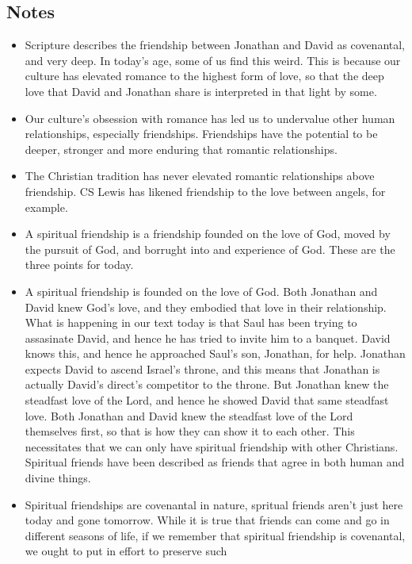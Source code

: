\subsection*{Notes}
\begin{itemize}
  \item{Scripture describes the friendship between Jonathan and David as
  covenantal, and very deep.  In today's age, some of us find this weird.
  This is because our culture has elevated romance to the highest form of
  love, so that the deep love that David and Jonathan share is interpreted in
  that light by some.}
  \item{Our culture's obsession with romance has led us to undervalue other
  human relationships, especially friendships.  Friendships have the
  potential to be deeper, stronger and more enduring that romantic
  relationships.}
  \item{The Christian tradition has never elevated romantic relationships
  above friendship.  CS Lewis has likened friendship to the love between
  angels, for example.}
  \item{A spiritual friendship is a friendship founded on the love of God,
  moved by the pursuit of God, and borrught into and experience of God.
  These are the three points for today.}
  \item{A spiritual friendship is founded on the love of God.  Both Jonathan
  and David knew God's love, and they embodied that love in their
  relationship.  What is happening in our text today is that Saul has been
  trying to assasinate David, and hence he has tried to invite him to a
  banquet.  David knows this, and hence he approached Saul's son, Jonathan,
  for help.  Jonathan expects David to ascend Israel's throne, and this means
  that Jonathan is actually David's direct's competitor to the throne.  But
  Jonathan knew the steadfast love of the Lord, and hence he showed David
  that same steadfast love.  Both Jonathan and David knew the steadfast love
  of the Lord themselves first, so that is how they can show it to each
  other.  This necessitates that we can only have spiritual friendship with
  other Christians.  Spiritual friends have been described as friends that
  agree in both human and divine things.}
  \item{Spiritual friendships are covenantal in nature, spritual friends
  aren't just here today and gone tomorrow.  While it is true that friends
  can come and go in different seasons of life, if we remember that spiritual
  friendship is covenantal, we ought to put in effort to preserve such
}
\end{itemize}
